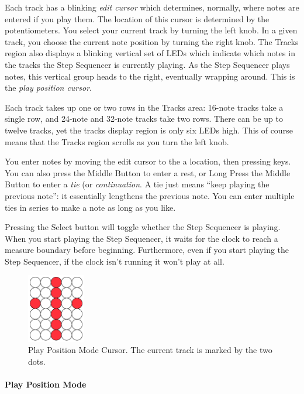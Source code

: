 \documentclass{article}
\begin{document}
Each track has a blinking {\it edit cursor} which determines, normally, where notes are entered if you play them.  The location of this cursor is determined by the potentiometers.  You select your current track by turning the left knob.  In a given track, you choose the current note position by turning the right knob.  The Tracks region also displays a blinking vertical set of LEDs which indicate which notes in the tracks the Step Sequencer is currently playing.  As the Step Sequencer plays notes, this vertical group heads to the right, eventually wrapping around.  This is the {\it play position cursor}.

Each track takes up one or two rows in the Tracks area: 16-note tracks take a single row, and 24-note and 32-note tracks take two rows.    There can be up to twelve tracks, yet the tracks display region is only six LEDs high.  This of course means that  the Tracks region scrolls as you turn the left knob.

You enter notes by moving the edit cursor to the a location, then pressing keys.  You can also press the Middle Button to enter a rest, or Long Press the Middle Button to enter a {\it tie} (or {\it continuation}.  A tie just means ``keep playing the previous note'': it essentially lengthens the previous note.  You can enter multiple ties in series to make a note as long as you like.

Pressing the Select button will toggle whether the Step Sequencer is playing.  When you start playing the Step Sequencer, it waits for the clock to reach a measure boundary before beginning.  Furthermore, even if you start playing the Step Sequencer, if the clock isn't running it won't play at all.

\begin{figure}
\vspace{-3em}\includegraphics[width=1in]{playpositionmode}
\vspace{-1em}
\caption{\small Play Position Mode Cursor.  The current track is marked by the two dots.}\vspace{-2em}
\label{playpositionmode}
\end{figure}

\paragraph{Play Position Mode}
\end{document}
